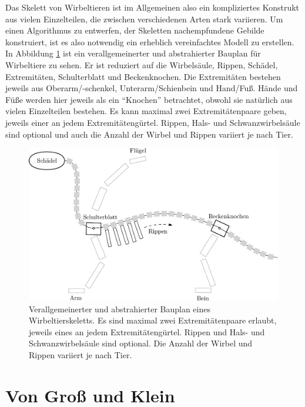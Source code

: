 Das Skelett von Wirbeltieren ist im Allgemeinen also ein kompliziertes Konstrukt aus vielen Einzelteilen, die zwischen verschiedenen Arten stark variieren. Um einen Algorithmus zu entwerfen, der Skeletten nachempfundene Gebilde konstruiert, ist es also notwendig ein erheblich vereinfachtes Modell zu erstellen.\\ 
In Abbildung \ref{bauplan_skelett} ist ein verallgemeinerter und abstrahierter Bauplan für Wirbeltiere zu sehen. Er ist reduziert auf die Wirbelsäule, Rippen, Schädel, Extremitäten, Schulterblatt und Beckenknochen. Die Extremitäten bestehen jeweils aus Oberarm/-schenkel, Unterarm/Schienbein und Hand/Fuß. Hände und Füße werden hier jeweils als ein "`Knochen"' betrachtet, obwohl sie natürlich aus vielen Einzelteilen bestehen. Es kann maximal zwei Extremitätenpaare geben, jeweils einer an jedem Extremitätengürtel. Rippen, Hals- und Schwanzwirbelsäule sind optional und auch die Anzahl der Wirbel und Rippen variiert je nach Tier.

\begin{figure}
 \centering
 \includegraphics[width=\textwidth]{graphics/skeletonPlan}
 \caption{Verallgemeinerter und abstrahierter Bauplan eines Wirbeltierskeletts. Es sind maximal zwei Extremitätenpaare erlaubt, jeweils eines an jedem Extremitätengürtel. Rippen und Hals- und Schwanzwirbelsäule sind optional. Die Anzahl der Wirbel und Rippen variiert je nach Tier.}
 \label{bauplan_skelett}
\end{figure}


\section{Von Groß und Klein}
\label{bigAndSmall}

